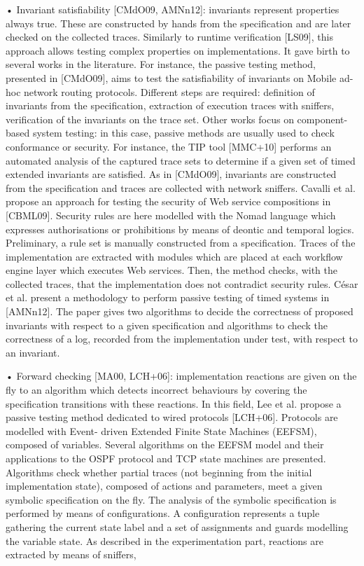 • Invariant satisfiability [CMdO09, AMNn12]: invariants represent
properties always true. These are constructed by hands from the
specification and are later checked on the collected traces.
Similarly to runtime verification [LS09], this approach allows
testing complex properties on implementations. It gave birth to
several works in the literature. For instance, the passive
testing method, presented in [CMdO09], aims to test the
satisfiability of invariants on Mobile ad-hoc network routing
protocols. Different steps are required: definition of invariants
from the specification, extraction of execution traces with
sniffers, verification of the invariants on the trace set. Other
works focus on component-based system testing: in this case,
passive methods are usually used to check conformance or
security. For instance, the TIP tool [MMC+10] performs an
automated analysis of the captured trace sets to determine if a
given set of timed extended invariants are satisfied. As in
[CMdO09], invariants are constructed from the specification and
traces are collected with network sniffers. Cavalli et al.
propose an approach for testing the security of Web service
compositions in [CBML09]. Security rules are here modelled with
the Nomad language which expresses authorisations or prohibitions
by means of deontic and temporal logics. Preliminary, a rule set
is manually constructed from a specification. Traces of the
implementation are extracted with modules which are placed at
each workflow engine layer which executes Web services. Then, the
method checks, with the collected traces, that the implementation
does not contradict security rules. César et al. present a
methodology to perform passive testing of timed systems in
[AMNn12]. The paper gives two algorithms to decide the
correctness of proposed invariants with respect to a given
specification and algorithms to check the correctness of a log,
recorded from the implementation under test, with respect to an
invariant.

• Forward checking [MA00, LCH+06]: implementation reactions are
given on the fly to an algorithm which detects incorrect
behaviours by covering the specification transitions with these
reactions. In this field, Lee et al. propose a passive testing
method dedicated to wired protocols [LCH+06]. Protocols are
modelled with Event- driven Extended Finite State Machines
(EEFSM), composed of variables. Several algorithms on the EEFSM
model and their applications to the OSPF protocol and TCP state
machines are presented. Algorithms check whether partial traces
(not beginning from the initial implementation state), composed
of actions and parameters, meet a given symbolic specification on
the fly. The analysis of the symbolic specification is performed
by means of configurations. A configuration represents a tuple
gathering the current state label and a set of assignments and
guards modelling the variable state. As described in the
experimentation part, reactions are extracted by means of
sniffers,

